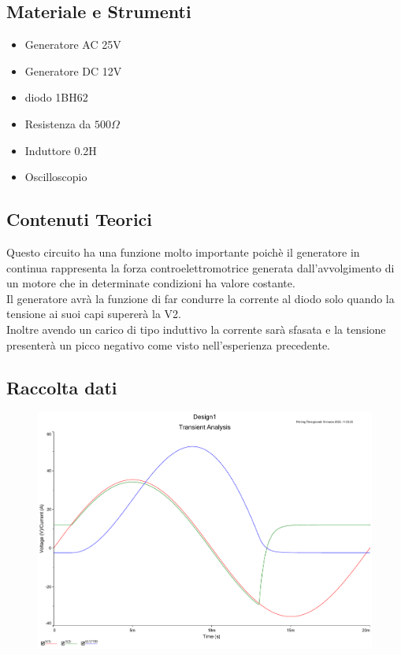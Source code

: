 \documentclass[12pt]{article}
\begin{document}
\subsection{Materiale e Strumenti}
\begin{multicols}{2}
	\begin{itemize}
		\item Generatore AC 25V
		\item Generatore DC 12V
		\item diodo 1BH62
		\item Resistenza da $500\Omega$
		\item Induttore 0.2H
	\end{itemize}
	\vfill\null
	\columnbreak
	\begin{itemize}
		\item Oscilloscopio
	\end{itemize}
	\vfill\null
\end{multicols}

\subsection{Contenuti Teorici}
Questo circuito ha una funzione molto importante poichè il generatore in continua rappresenta la forza controelettromotrice
generata dall'avvolgimento di un motore che in determinate condizioni ha valore costante.\\
Il generatore avrà la funzione di far condurre la corrente al diodo solo quando la tensione ai suoi capi
supererà la V2.\\
Inoltre avendo un carico di tipo induttivo la corrente sarà sfasata e la tensione presenterà un picco negativo
come visto nell'esperienza precedente.\\
\subsection{Raccolta dati}
\begin{figure}[H]
	\includegraphics[scale=0.5]{osc-es1.pdf}
\end{figure}
\end{document}
